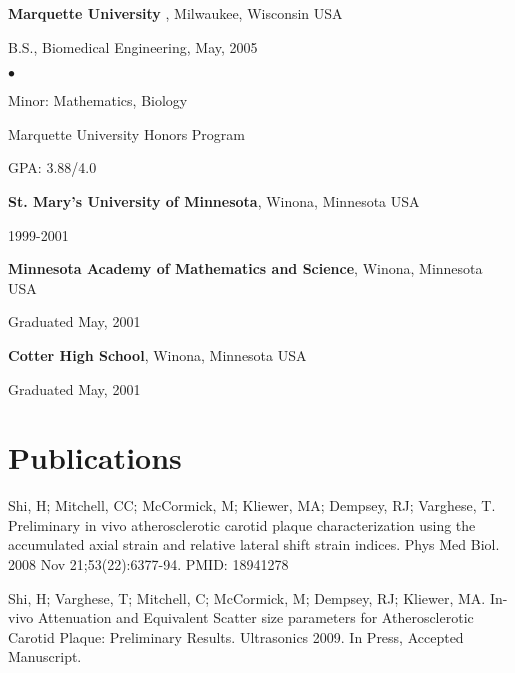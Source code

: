 \documentclass[margin,line]{res}
\newenvironment{list1}{
  \begin{list}{\ding{113}}{%
      \setlength{\itemsep}{0in}
      \setlength{\parsep}{0in} \setlength{\parskip}{0in}
      \setlength{\topsep}{0in} \setlength{\partopsep}{0in} 
      \setlength{\leftmargin}{0.17in}}}{\end{list}}
\newenvironment{list2}{
  \begin{list}{$\bullet$}{%
      \setlength{\itemsep}{0in}
      \setlength{\parsep}{0in} \setlength{\parskip}{0in}
      \setlength{\topsep}{0in} \setlength{\partopsep}{0in} 
      \setlength{\leftmargin}{0.2in}}}{\end{list}}
\begin{document}
\begin{resume}
{\bf Marquette University }, Milwaukee, Wisconsin USA\\
\vspace*{-.1in}
\begin{list1}
\item[] B.S., Biomedical Engineering,  May, 2005

\begin{list2}
 \vspace*{.05in}
 \item Minor: Mathematics, Biology
 \item Marquette University Honors Program
 \item GPA: 3.88/4.0
\end{list2}
\end{list1}

{\bf St. Mary's University of Minnesota}, Winona, Minnesota USA\\
\vspace*{-.1in}
\begin{list1}
\item[] 1999-2001
\end{list1}


{\bf Minnesota Academy of Mathematics and Science}, Winona, Minnesota USA\\
\vspace*{-.1in}
\begin{list1}
\item[] Graduated May, 2001
\end{list1}

{\bf Cotter High School}, Winona, Minnesota USA\\
\vspace*{-.1in}
\begin{list1}
\item[] Graduated May, 2001
\end{list1}



\section{\sc Publications}
Shi, H; Mitchell, CC; McCormick, M; Kliewer, MA; Dempsey, RJ; Varghese, T.  
Preliminary in vivo atherosclerotic carotid plaque characterization
using the accumulated axial strain and relative lateral shift strain
indices.  Phys Med Biol. 2008 Nov 21;53(22):6377-94.  PMID:
18941278

Shi, H; Varghese, T; Mitchell, C; McCormick, M; Dempsey, RJ; Kliewer, MA.  
In-vivo Attenuation and Equivalent Scatter size parameters for Atherosclerotic
Carotid Plaque: Preliminary Results.  Ultrasonics 2009.  In Press, Accepted
Manuscript.


\end{resume}
\end{document}
